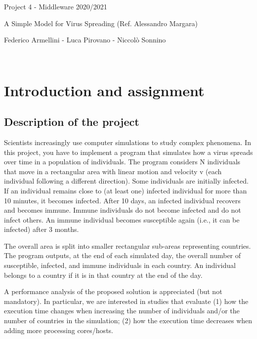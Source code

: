 \documentclass[table, 12pt]{article}
\begin{document}
\begin{center}
\fontsize{23pt}{23pt}\selectfont
Project 4 - Middleware 2020/2021

\fontsize{18pt}{18pt}\selectfont
A Simple Model for Virus Spreading (Ref. Alessandro Margara)

\fontsize{19pt}{19pt}\selectfont
Federico Armellini - Luca Pirovano - Niccolò Sonnino
\end{center}

~\\

\tableofcontents


\section{Introduction and assignment}
\subsection{Description of the project}
Scientists increasingly use computer simulations to study complex phenomena. In this project, you have to
implement a program that simulates how a virus spreads over time in a population of individuals. The program
considers N individuals that move in a rectangular area with linear motion and velocity v (each individual
following a different direction). Some individuals are initially infected. If an individual remains close to (at least
one) infected individual for more than 10 minutes, it becomes infected. After 10 days, an infected individual
recovers and becomes immune. Immune individuals do not become infected and do not infect others. An
immune individual becomes susceptible again (i.e., it can be infected) after 3 months.

The overall area is split into smaller rectangular sub-areas representing countries. The program outputs, at the
end of each simulated day, the overall number of susceptible, infected, and immune individuals in each country.
An individual belongs to a country if it is in that country at the end of the day.

A performance analysis of the proposed solution is appreciated (but not mandatory). In particular, we are
interested in studies that evaluate (1) how the execution time changes when increasing the number of
individuals and/or the number of countries in the simulation; (2) how the execution time decreases when
adding more processing cores/hosts.
\end{document}
